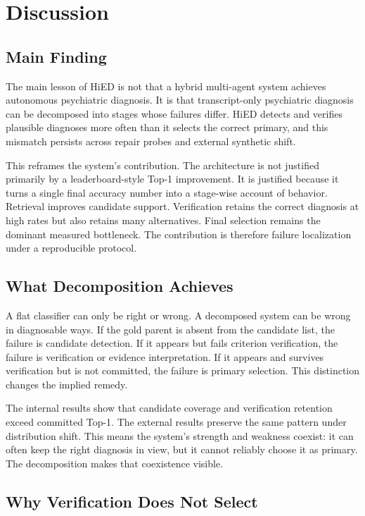 \chapter{Discussion}
\label{ch:discussion}

\section{Main Finding}

The main lesson of HiED is not that a hybrid multi-agent system achieves autonomous psychiatric diagnosis. It is that transcript-only psychiatric diagnosis can be decomposed into stages whose failures differ. HiED detects and verifies plausible diagnoses more often than it selects the correct primary, and this mismatch persists across repair probes and external synthetic shift.

This reframes the system's contribution. The architecture is not justified primarily by a leaderboard-style Top-1 improvement. It is justified because it turns a single final accuracy number into a stage-wise account of behavior. Retrieval improves candidate support. Verification retains the correct diagnosis at high rates but also retains many alternatives. Final selection remains the dominant measured bottleneck. The contribution is therefore failure localization under a reproducible protocol.

\section{What Decomposition Achieves}

A flat classifier can only be right or wrong. A decomposed system can be wrong in diagnosable ways. If the gold parent is absent from the candidate list, the failure is candidate detection. If it appears but fails criterion verification, the failure is verification or evidence interpretation. If it appears and survives verification but is not committed, the failure is primary selection. This distinction changes the implied remedy.

The internal results show that candidate coverage and verification retention exceed committed Top-1. The external results preserve the same pattern under distribution shift. This means the system's strength and weakness coexist: it can often keep the right diagnosis in view, but it cannot reliably choose it as primary. The decomposition makes that coexistence visible.

\section{Why Verification Does Not Select}

